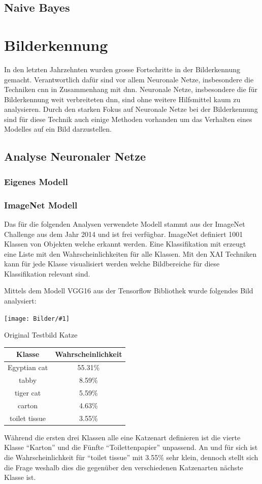 \documentclass[
  12pt, %
  a4paper, %
  oneside, %
  openany, 
  numbers=noenddot, %
  BCOR=5mm, %
  parskip=half*, %
  thesis, %
]{bfhbook}
\newcommand{\imgText}[3]{
\begin{center}
    \begin{minipage}[t]{0.6\textwidth}
    		\vspace{0pt}
		\texttt{[image: Bilder/\#1]}
		\caption{#2}
	\end{minipage}\hfill
    \begin{minipage}[t]{0.4\textwidth}
    		\vspace{0pt}
  		#3
    \end{minipage}
\end{center}
}
\begin{document}
\subsection{Naive Bayes}

\section{Bilderkennung}
In den letzten Jahrzehnten wurden grosse Fortschritte in der Bilderkennung gemacht. Verantwortlich dafür sind vor allem Neuronale Netze, insbesondere die Techniken \acrfull{cnn} in Zusammenhang mit {dnn}. Neuronale Netze, insbesondere die für Bilderkennung weit verbreiteten \acrfull{dnn}, sind ohne weitere Hilfsmittel kaum zu analysieren.
Durch den starken Fokus auf Neuronale Netze bei der Bilderkennung sind für diese Technik auch einige Methoden vorhanden um das Verhalten eines Modelles  auf ein Bild darzustellen.
\subsection{Analyse Neuronaler Netze}
\subsubsection*{Eigenes Modell}
\subsubsection*{ImageNet Modell}
Das für die folgenden Analysen verwendete Modell \parencite{Simonyan2014} stammt aus der ImageNet Challenge \cite{imageNet} aus dem Jahr 2014 und ist frei verfügbar. ImageNet definiert 1001 Klassen von Objekten welche erkannt werden. Eine Klassifikation mit \cite{TensorFlow} erzeugt eine Liste mit den Wahrscheinlichkeiten für alle Klassen. Mit den \acrfull{XAI} Techniken kann für jede Klasse visualisiert werden welche Bildbereiche für diese Klassifikation relevant sind.

Mittels dem Modell VGG16 aus der Tensorflow Bibliothek \cite{vgg16} wurde folgendes Bild analysiert:
\imgText{Mira.jpg}{Original Testbild Katze}{
		\begin{tabular}{ |c|c| } 
		 \hline
		 Klasse & Wahrscheinlichkeit \\
		 \hline
		 Egyptian cat & 55.31\% \\ 
		 tabby & 8.59\% \\ 
		 tiger cat & 5.59\% \\ 
		 carton & 4.63\% \\
		 toilet tissue & 3.55\% \\
		 \hline
		\end{tabular}
		\break
		Während die ersten drei Klassen alle eine Katzenart definieren ist die vierte Klasse ``Karton'' und die Fünfte ``Toilettenpapier'' unpassend. An und für sich ist die Wahrscheinlichkeit für ``toilet tissue'' mit 3.55\% sehr klein, dennoch stellt sich die Frage weshalb dies die gegenüber den verschiedenen Katzenarten nächste Klasse ist.
}
\end{document}
